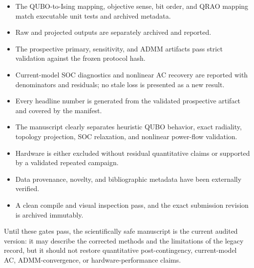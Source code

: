 \documentclass[11pt]{article}
\begin{document}
\begin{itemize}
  \item[$\square$] The QUBO-to-Ising mapping, objective sense, bit order, and
  QRAO mapping match executable unit tests and archived metadata.
  \item[$\square$] Raw and projected outputs are separately archived and
  reported.
  \item[$\square$] The prospective primary, sensitivity, and ADMM artifacts
  pass strict validation against the frozen protocol hash.
  \item[$\square$] Current-model SOC diagnostics and nonlinear AC recovery are
  reported with denominators and residuals; no stale loss is presented as a
  new result.
  \item[$\square$] Every headline number is generated from the validated
  prospective artifact and covered by the manifest.
  \item[$\square$] The manuscript clearly separates heuristic QUBO behavior,
  exact radiality, topology projection, SOC relaxation, and nonlinear
  power-flow validation.
  \item[$\square$] Hardware is either excluded without residual quantitative
  claims or supported by a validated repeated campaign.
  \item[$\square$] Data provenance, novelty, and bibliographic metadata have
  been externally verified.
  \item[$\square$] A clean compile and visual inspection pass, and the exact
  submission revision is archived immutably.
\end{itemize}

Until these gates pass, the scientifically safe manuscript is the current
audited version: it may describe the corrected methods and the limitations of
the legacy record, but it should not restore quantitative post-contingency,
current-model AC, ADMM-convergence, or hardware-performance claims.
\end{document}
